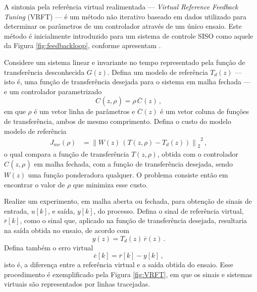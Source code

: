 \documentclass[repeatfields,oneside]{tcc}
\newcommand{\mycdot}{ \, }
\newcommand{\myC}[2][]{ C_{#1} \left( #2 \right) }
\newcommand{\myoC}[2][]{ \overline{C_{#1}} \left( #2 \right) }
\newcommand{\myCzrho}[1]{ \myC[#1]{z, \rho_{#1}} }
\begin{document}
A sintonia pela referência virtual realimentada --- \textit{Virtual Reference Feedback Tuning} (VRFT) --- é um método não iterativo baseado em dados utilizado para determinar os parâmetros de um controlador através de um único ensaio.
Este método é inicialmente introduzido para um sistema de controle SISO como aquele da Figura \ref{fig:feedbackloop}, conforme apresentam \textcite{Campi2000}.

Considere um sistema linear e invariante no tempo representado pela função de transferência desconhecida $G(z)$.
Defina um modelo de referência $T_d(z)$ --- isto é, uma função de transferência desejada para o sistema em malha fechada --- e um controlador parametrizado
\begin{equation}\label{eq:VRFT_Czrho}
    \myCzrho{} = \rho \mycdot \myoC[]{z}
    \,,
\end{equation}
em que $\rho$ é um vetor linha de parâmetros e $\myoC[]{z}$ é um vetor coluna de funções de transferência, ambos de mesmo comprimento.
Defina o custo do modelo modelo de referência
\begin{equation}\label{eq:VRFT_Jmr}
\begin{aligned}
    J_{mr} \left( \rho \right)
    &= {\left\lVert W(z) \mycdot \left( T(z, \rho) - T_d(z) \right) \right\rVert_2}^2
    \,,
\end{aligned}
\end{equation}
o qual compara a função de transferência $T(z, \rho)$, obtida com o controlador $\myCzrho{}$ em malha fechada, com a função de transferência desejada, sendo $W(z)$ uma função ponderadora qualquer.
O problema consiste então em encontrar o valor de $\rho$ que minimiza esse custo.

Realize um experimento, em malha aberta ou fechada, para obtenção de sinais de entrada, $u[k]$, e saída, $y[k]$, do processo.
Defina o sinal de referência virtual, $\overline{r}[k]$, como o sinal que, aplicado na função de transferência desejada, resultaria na saída obtida no ensaio, de acordo com
\begin{equation}\label{eq:VRFT_rv}
    y(z) = T_d(z) \mycdot \overline{r}(z)
    \,.
\end{equation}
Defina também o erro virtual
\begin{equation}\label{eq:VRFT_ev}
    \overline{e}[k] = \overline{r}[k] - y[k]
    \,,
\end{equation}
isto é,  a diferença entre a referência virtual e a saída obtida do ensaio.
Esse procedimento é exemplificado pela Figura \ref{fig:VRFT}, em que os sinais e sistemas virtuais são representados por linhas tracejadas.
\end{document}
